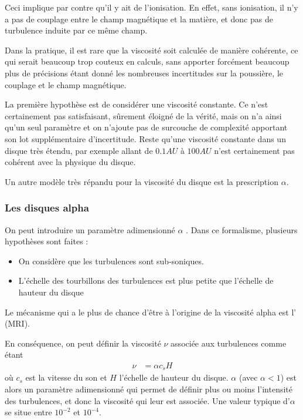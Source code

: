 Ceci implique par contre qu'il y ait de l'ionisation. En effet, sans ionisation, il n'y a pas de couplage entre le champ magnétique et la matière, et donc pas de turbulence induite par ce même champ. 

Dans la pratique, il est rare que la viscosité soit calculée de manière cohérente, ce qui serait beaucoup trop couteux en calculs, sans apporter forcément beaucoup plus de précisions étant donné les nombreuses incertitudes sur la poussière, le couplage et le champ magnétique. 

\bigskip

La première hypothèse est de considérer une viscosité constante. Ce n'est certainement pas satisfaisant, sûrement éloigné de la vérité, mais on n'a ainsi qu'un seul paramètre et on n'ajoute pas de surcouche de complexité apportant son lot supplémentaire d'incertitude. Reste qu'une viscosité constante dans un disque très étendu, par exemple allant de $0.1\unit{AU}$ à $100\unit{AU}$ n'est certainement pas cohérent avec la physique du disque. 

Un autre modèle très répandu pour la viscosité du disque est la prescription $\alpha$.

\subsubsection{Les disques alpha}
On peut introduire un paramètre adimensionné $\alpha$ \citep{shakura1973black}. Dans ce formalisme, plusieurs hypothèses sont faites : 
\begin{itemize}
\item On considère que les turbulences sont sub-soniques.
\item L'échelle des tourbillons des turbulences est plus petite que l'échelle de hauteur du disque
\end{itemize}
Le mécanisme qui a le plus de chance d'être à l'origine de la viscosité alpha est l' (MRI). 

\bigskip

En conséquence, on peut définir la viscosité $\nu$ associée aux turbulences comme étant 
\begin{align}
\nu &= \alpha c_s H
\end{align}
où $c_s$ est la vitesse du son et $H$ l'échelle de hauteur du disque. $\alpha$ (avec $\alpha < 1$) est alors un paramètre adimensionné qui permet de définir plus ou moins l'intensité des turbulences, et donc la viscosité qui leur est associée. Une valeur typique d'$\alpha$ se situe entre $10^{-2}$ et $10^{-4}$.

